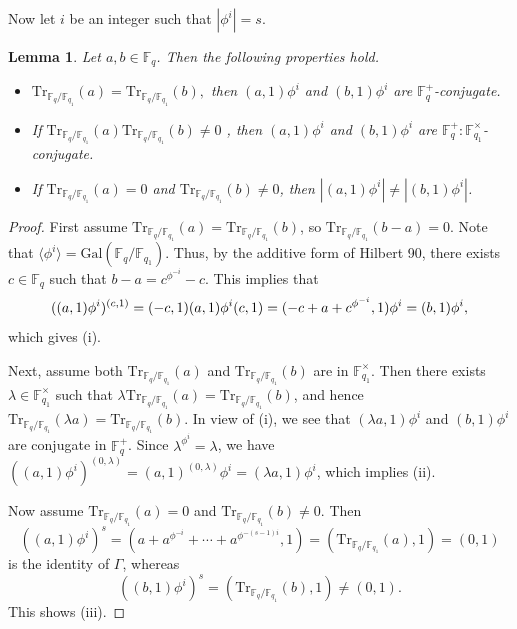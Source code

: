 \documentclass[twoside,a4paper,reqno,11pt]{amsart}
\newcommand{\<}{\langle}
\renewcommand{\>}{\rangle}
\newcommand{\la}{\langle}
\newcommand{\ra}{\rangle}
\newcommand{\Tr}{\mathrm{Tr}}
\newtheorem{lem}[thm]{Lemma}
\theoremstyle{definition}
\begin{document}
	Now let $i$ be an integer such that $|\phi^i|=s$.
	
	\begin{lem}
		\label{l:pre_AGammaL_conju}
		Let $a,b\in\mathbb{F}_q$. Then the following properties hold.
		\begin{itemize}\addtolength{\itemsep}{0.2\baselineskip}
			\item[{\rm (i)}] $\Tr_{\mathbb{F}_q/\mathbb{F}_{q_1}}(a)=\Tr_{\mathbb{F}_q/\mathbb{F}_{q_1}}(b),$ then $(a,1)\phi^i$ and $(b,1)\phi^i$ are $\mathbb{F}_q^+$-conjugate.
			\item[{\rm (ii)}] If $\Tr_{\mathbb{F}_q/\mathbb{F}_{q_1}}(a)\Tr_{\mathbb{F}_q/\mathbb{F}_{q_1}}(b)\neq 0$ , then $(a,1)\phi^i$ and $(b,1)\phi^i$ are $\mathbb{F}_q^+{:}\mathbb{F}_{q_1}^\times$-conjugate.
			\item[{\rm (iii)}] If $\Tr_{\mathbb{F}_q/\mathbb{F}_{q_1}}(a) = 0$ and $\Tr_{\mathbb{F}_q/\mathbb{F}_{q_1}}(b)\ne 0$, then $|(a,1)\phi^i|\ne|(b,1)\phi^i|$.
		\end{itemize}
	\end{lem}
	
	\begin{proof}
		First assume $\Tr_{\mathbb{F}_q/\mathbb{F}_{q_1}}(a)= \Tr_{\mathbb{F}_q/\mathbb{F}_{q_1}}(b)$, so $\Tr_{\mathbb{F}_q/\mathbb{F}_{q_1}}(b-a)=0$.
		Note that $\la \phi^i \ra=\mathrm{Gal}(\mathbb{F}_q/\mathbb{F}_{q_1}).$
		Thus, by the additive form of Hilbert 90, there exists $c\in\mathbb{F}_q$ such that $b- a = c^{\phi^{-i}}-c$.
		This implies that
		\begin{equation*}
		(( a,1)\phi^i)^{(c,1)}
		= (-c,1)( a,1)\phi^i(c,1) = (-c+ a+c^{\phi^{-i}},1)\phi^i = (b,1)\phi^i\\,
		\end{equation*}
		which gives (i).
		
		
		Next, assume both $\Tr_{\mathbb{F}_q/\mathbb{F}_{q_1}}(a)$ and $\Tr_{\mathbb{F}_q/\mathbb{F}_{q_1}}(b)$ are in $\mathbb{F}_{q_1}^{\times}$.
		Then there exists $\lambda\in \mathbb{F}_{q_1}^{\times}$ such that $\lambda\Tr_{\mathbb{F}_q/\mathbb{F}_{q_1}}(a)=\Tr_{\mathbb{F}_q/\mathbb{F}_{q_1}}(b)$, and hence $\Tr_{\mathbb{F}_q/\mathbb{F}_{q_1}}(\lambda a)=\Tr_{\mathbb{F}_q/\mathbb{F}_{q_1}}(b)$.
		In view of (i), we see that $(\lambda a, 1)\phi^i$ and $(b,1)\phi^i$ are conjugate in $\mathbb{F}_q^+$.
		Since $\lambda^{\phi^i}=\lambda$, we have
		$((a,1)\phi^i)^{(0,\lambda)}=(a,1)^{(0,\lambda)}\phi^i=(\lambda a, 1)\phi^i$, which implies (ii).
		
		Now assume $\Tr_{\mathbb{F}_q/\mathbb{F}_{q_1}}(a) = 0$ and $\Tr_{\mathbb{F}_q/\mathbb{F}_{q_1}}(b)\ne 0$.  Then
		\begin{equation*}
		((a,1)\phi^i)^s = (a+a^{\phi^{-i}}+\cdots+a^{\phi^{-(s-1)i}},1) = (\Tr_{\mathbb{F}_q/\mathbb{F}_{q_1}}(a),1) = (0,1)
		\end{equation*}
		is the identity of $\Gamma$, whereas
		\begin{equation*}
		((b,1)\phi^i)^s = (\Tr_{\mathbb{F}_q/\mathbb{F}_{q_1}}(b),1) \ne (0,1).
		\end{equation*}
		This shows (iii).
	\end{proof}
	
\end{document}
